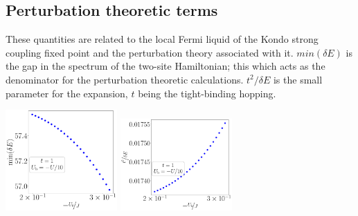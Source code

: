 \subsection*{Perturbation theoretic terms}
These quantities are related to the local Fermi liquid of the Kondo strong coupling fixed point and the perturbation theory associated with it. \(min(\delta E)\) is the gap in the spectrum of the two-site Hamiltonian; this which acts as the denominator for the perturbation theoretic calculations. \(t^2/\delta E\) is the small parameter for the expansion, \(t\) being the tight-binding hopping. 
\begin{center}
	\includegraphics[width=0.32\textwidth]{../figures/gap-D=1000.00000,t=1.00000,J=30.00000,V=1.50000J,Ub=-Uby10,N=4,U=59.85787,93.55363,25.pdf}
	\includegraphics[width=0.32\textwidth]{../figures/par-D=1000.00000,t=1.00000,J=30.00000,V=1.50000J,Ub=-Uby10,N=4,U=59.85787,93.55363,25.pdf}
\end{center}

